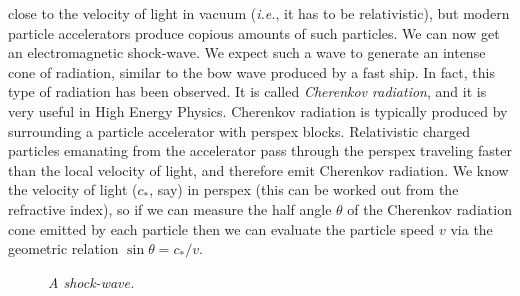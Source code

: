 close to the velocity of
light in vacuum ({\em i.e.}, it has to be relativistic), but modern particle accelerators produce
copious amounts of such particles. We can now get an electromagnetic 
shock-wave. We expect such a wave to generate
an intense cone of radiation,  similar to the bow wave produced by a fast ship. In fact, this
type of 
radiation has been observed. It is called {\em Cherenkov radiation}, and it is very useful in
High Energy Physics. Cherenkov radiation is typically produced by surrounding a particle accelerator
with perspex blocks. Relativistic charged particles emanating from the accelerator pass through the perspex
traveling faster than the local velocity of light,  and therefore emit
Cherenkov radiation. We know the velocity of light ($c_\ast$, say)
 in perspex (this can be worked out from the
refractive index), so if we can measure the half angle $\theta$ of the Cherenkov radiation  cone
 emitted by each particle
then  we can evaluate the particle speed  $v$ via the geometric relation
$\sin\theta= c_\ast/v$. 
\begin{figure}
\epsfysize=2.25in
\centerline{}
\caption{\em A shock-wave.}\label{f38}
\end{figure}

